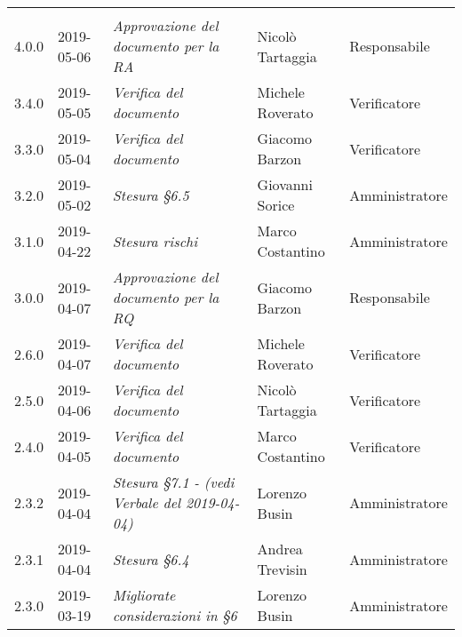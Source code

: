 \newpage
\section*{}
	\begin{longtable}{C{2cm}|C{2.5cm}|C{4.5cm}|C{2.5cm}|C{3cm}}

		 &  &  & &\\
		\endhead
		
		4.0.0 & 2019-05-06 & \emph{Approvazione del documento per la RA} & Nicolò Tartaggia & Responsabile \\
		\hline
		
		3.4.0 & 2019-05-05 & \emph{Verifica del documento} & Michele Roverato & Verificatore\\
		\hline
		
		3.3.0 & 2019-05-04 & \emph{Verifica del documento} & Giacomo Barzon & Verificatore \\
		\hline
		
		3.2.0 & 2019-05-02 & \emph{Stesura §6.5} & Giovanni Sorice & Amministratore\\
		\hline
		
		3.1.0 & 2019-04-22 & \emph{Stesura rischi} & Marco Costantino & Amministratore\\
		\hline
		
		3.0.0 & 2019-04-07 & \emph{Approvazione del documento per la RQ} & Giacomo Barzon & Responsabile \\
		\hline
		
		2.6.0 & 2019-04-07 & \emph{Verifica del documento} & Michele Roverato & Verificatore \\
		\hline
		
		2.5.0 & 2019-04-06 & \emph{Verifica del documento} & Nicolò Tartaggia & Verificatore \\
		\hline
		
		2.4.0 & 2019-04-05 & \emph{Verifica del documento} & Marco Costantino & Verificatore \\
		\hline
		
		2.3.2 & 2019-04-04 & \emph{Stesura §7.1 - (vedi Verbale del 2019-04-04)} & Lorenzo Busin & Amministratore \\
		\hline
		
		2.3.1 & 2019-04-04 & \emph{Stesura §6.4} & Andrea Trevisin & Amministratore \\
		\hline
		
		2.3.0 & 2019-03-19 & \emph{Migliorate considerazioni in §6} & Lorenzo Busin & Amministratore \\
		\hline
		

\end{longtable}
